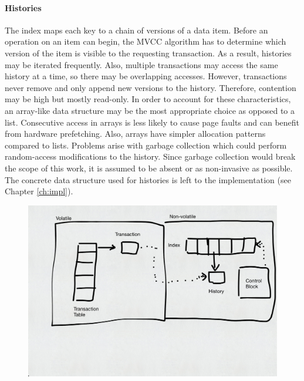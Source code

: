 \paragraph{Histories}

The index maps each key to a chain of versions of a data item. Before an
operation on an item can begin, the \ac{MVCC} algorithm has to determine which
version of the item is visible to the requesting transaction. As a result,
histories may be iterated frequently. Also, multiple transactions may access the
same history at a time, so there may be overlapping accesses. However,
transactions never remove and only append new versions to the history.
Therefore, contention may be high but mostly read-only. In order to account for
these characteristics, an array-like data structure may be the most appropriate
choice as opposed to a list. Consecutive access in arrays is less likely to
cause page faults and can benefit from hardware prefetching. Also, arrays have
simpler allocation patterns compared to lists. Problems arise with garbage
collection which could perform random-access modifications to the history. Since
garbage collection would break the scope of this work, it is assumed to be
absent or as non-invasive as possible. The concrete data structure used for
histories is left to the implementation (see Chapter \ref{ch:impl}).


\begin{figure}[h!]
    \centering
    \includegraphics[width=\textwidth]{figures/drafts/concept-struct-complete.pdf}
    \caption{}
    \label{fig:concept-struct-complete}
\end{figure}

